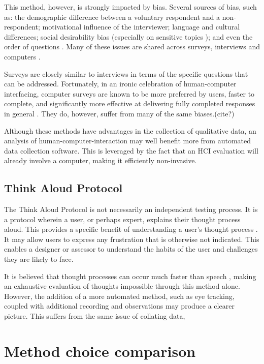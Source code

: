 \documentclass{scrartcl}
\begin{document}
This method, however, is strongly impacted by bias. Several sources of bias, such as: the demographic difference between a voluntary respondent and a non-respondent; motivational influence of the interviewer; language and cultural differences; social desirability bias (especially on sensitive topics \cite{sensitivequestions}); and even the order of questions \cite{questionnairebias}. Many of these issues are shared across surveys, interviews and computers \cite{moresurveybias} \cite{questionnairebias}.

Surveys are closely similar to interviews in terms of the specific questions that can be addressed. Fortunately, in an ironic celebration of human-computer interfacing, computer surveys are known to be more preferred by users, faster to complete, and significantly more effective at delivering fully completed responses in general \cite{computersurveys}. They do, however, suffer from many of the same biases.(cite?)

Although these methods have advantages in the collection of qualitative data, an analysis of human-computer-interaction may well benefit more from automated data collection software. This is leveraged by the fact that an HCI evaluation will already involve a computer, making it efficiently non-invasive.

\subsection{Think Aloud Protocol}
The Think Aloud Protocol is not necessarily an independent testing process. It is a protocol wherein a user, or perhaps expert, explains their thought process aloud. This provides a specific benefit of understanding a user's thought process \cite{haak_exploring_2003}. It may allow users to express any frustration that is otherwise not indicated. This enables a designer or assessor to understand the habits of the user and challenges they are likely to face.

It is believed that thought processes can occur much faster than speech \cite{e._fonteyn_description_1993}, making an exhaustive evaluation of thoughts impossible through this method alone. However, the addition of a more automated method, such as eye tracking, coupled with additional recording and observations may produce a clearer picture. This suffers from the same issue of collating data, 

\section{Method choice comparison}
\end{document}
